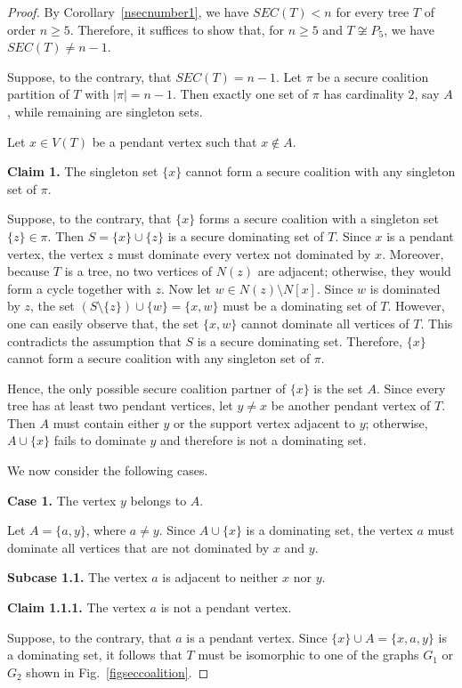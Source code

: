 \documentclass[12pt]{article}
\begin{document}
\begin{proof}
By Corollary~\ref{nsecnumber1}, we have $SEC(T)<n$ for every tree $T$ of order $n\ge 5$. Therefore, it suffices to show that, for $n\ge 5$ and $T\not\cong P_5$, we have $SEC(T)\neq n-1$.

Suppose, to the contrary, that $SEC(T)=n-1$. Let $\pi$ be a secure coalition partition of $T$ with $|\pi|=n-1$. Then exactly one set of $\pi$ has cardinality $2$, say $A$, while remaining are singleton sets.

Let $x\in V(T)$ be a pendant vertex such that $x\notin A$.

\textbf{Claim 1.} The singleton set $\{x\}$ cannot form a secure coalition with any singleton set of $\pi$.

Suppose, to the contrary, that $\{x\}$ forms a secure coalition with a singleton set $\{z\}\in\pi$. Then $S=\{x\}\cup\{z\}$
is a secure dominating set of $T$. Since $x$ is a pendant vertex, the vertex $z$ must dominate every vertex not dominated by $x$. Moreover, because $T$ is a tree, no two vertices of $N(z)$ are adjacent; otherwise, they would form a cycle together with $z$.
Now let $w\in N(z)\setminus N[x]$. Since $w$ is dominated by $z$, the set $(S\setminus\{z\})\cup\{w\} =\{x,w\}$
must be a dominating set of $T$. However, one can easily observe that, the set $\{x,w\}$ cannot dominate all vertices of $T$. This contradicts the assumption that $S$ is a secure dominating set. Therefore, $\{x\}$ cannot form a secure coalition with any singleton set of $\pi$.

Hence, the only possible secure coalition partner of $\{x\}$ is the set $A$. Since every tree has at least two pendant vertices, let $y\neq x$ be another pendant vertex of $T$. Then $A$ must contain either $y$ or the support vertex adjacent to $y$; otherwise, $A\cup\{x\}$ fails to dominate $y$ and therefore is not a dominating set.

We now consider the following cases.

\textbf{Case 1.} The vertex $y$ belongs to $A$.

Let $A=\{a,y\}$, where $a\neq y$. Since $A\cup\{x\}$ is a dominating set, the vertex $a$ must dominate all vertices that are not dominated by $x$ and $y$.

\textbf{Subcase 1.1.} The vertex $a$ is adjacent to neither $x$ nor $y$.

\textbf{Claim 1.1.1.} The vertex $a$ is not a pendant vertex.

Suppose, to the contrary, that $a$ is a pendant vertex. Since $\{x\}\cup A=\{x,a,y\}$ is a dominating set, it follows that $T$ must be isomorphic to one of the graphs $G_1$ or $G_2$ shown in Fig.~\ref{figseccoalition}.


\end{proof}
\end{document}
